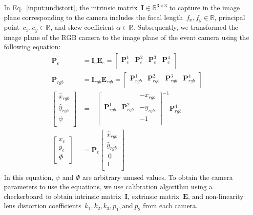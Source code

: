 \documentclass[preprint,12pt,authoryear]{elsarticle}
\begin{document}
In Eq.~\ref{input:undistort}, the intrinsic matrix~$\textbf{I} \in \mathbb{R}^{3\times3}$ to capture in the image plane corresponding to the camera includes the focal length~$f_{x}, f_{y} \in \mathbb{R}$, principal point~$c_{x}, c_{y}  \in \mathbb{R}$, and skew coefficient $\alpha  \in \mathbb{R}$. Subsequently, we transformed the image plane of the RGB camera to the image plane of the event camera using the following equation:
\begin{equation}
\begin{aligned}
\textbf{P}_{e}&=\textbf{I}_{e}\textbf{E}_{e}=\begin{bmatrix}
 \textbf{P}^{1}_{e} & \textbf{P}^{2}_{e} & \textbf{P}^{3}_{e} & \textbf{P}^{4}_{e}  \\
\end{bmatrix} \\
\textbf{P}_{rgb}&=\textbf{I}_{rgb}\textbf{E}_{rgb}=\begin{bmatrix}
 \textbf{P}^{1}_{rgb} & \textbf{P}^{2}_{rgb} & \textbf{P}^{3}_{rgb} & \textbf{P}^{4}_{rgb}  \\
\end{bmatrix} \\
\begin{bmatrix}
 \hat{x}_{rgb} \\ \hat{y}_{rgb} \\ \psi  \\
\end{bmatrix}&=-\begin{bmatrix}
  &  & -x_{rgb}  \\
 \textbf{P}^{1}_{rgb} & \textbf{P}^{2}_{rgb} & -y_{rgb}  \\
  &  &  -1  \\
\end{bmatrix}^{-1} \textbf{P}^{4}_{rgb} \\
\begin{bmatrix}
 x_{e} \\ y_{e} \\ \Phi \\
\end{bmatrix}
&=\textbf{P}_{e}\begin{bmatrix}
 \hat{x}_{rgb} \\ \hat{y}_{rgb} \\ \ 0 \\ 1 \\
\end{bmatrix}
\end{aligned}
\label{input:planetransform}
\end{equation}
In this equation, $\psi$ and $\Phi$ are arbitrary unused values. To obtain the camera parameters to use the equations, we use \citep{zhang2000flexible} calibration algorithm using a checkerboard to obtain intrinsic matrix~$\textbf{I}$, extrinsic matrix~$\textbf{E}$, and non-linearity lens distortion coefficients~$k_{1}, k_{2}, k_{3}, p_{1}, \text{and}~p_{2}$ from each camera.
\end{document}
